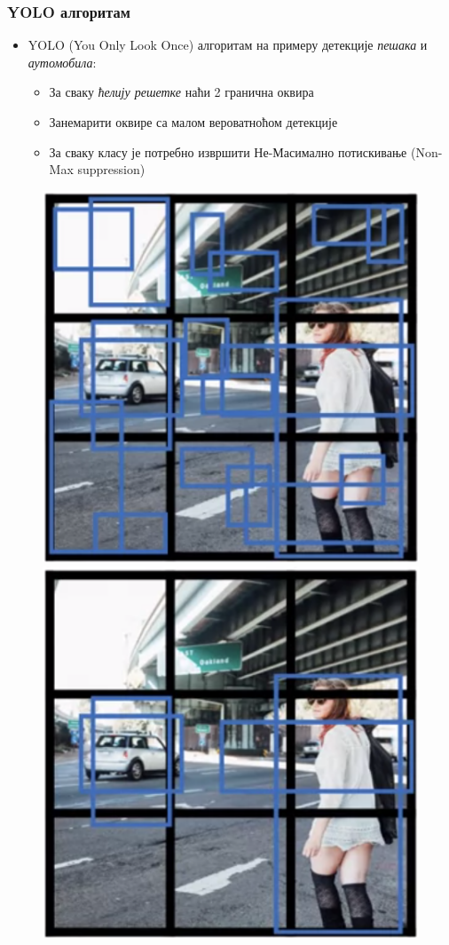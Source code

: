 \begin{frame}
\frametitle{YOLO алгоритам}
\begin{itemize}
 \item \alert{YOLO} (\alert{You Only Look Once}) \alert{алгоритам} на
 примеру детекције \textit{пешака} и \textit{аутомобила}:
 \begin{itemize}
  \item За сваку \textit{ћелију решетке} наћи 2 гранична
  оквира
  \item Занемарити оквире са малом вероватноћом детекције
  \item За сваку класу је потребно извршити Не-Масимално
  потискивање (Non-Max suppression)
 \end{itemize}
\end{itemize}
\begin{figure}[H]
  \centering
      \includegraphics[scale=0.26]{slike/ngYOLO2.png} \quad
      \includegraphics[scale=0.26]{slike/ngYOLO3.png} \quad

\end{figure}
\end{frame}
